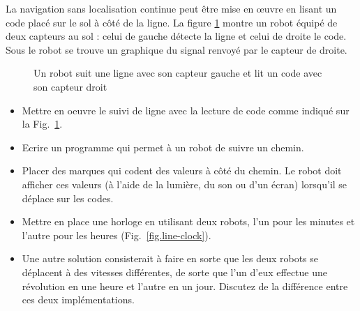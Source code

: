 La navigation sans localisation continue peut être mise en œuvre en lisant un code placé sur le sol à côté de la ligne. La figure \ref{fig.code-line} montre un robot équipé de deux capteurs au sol : celui de gauche détecte la ligne et celui de droite le code. Sous le robot se trouve un graphique du signal renvoyé par le capteur de droite.

\begin{figure}
\begin{center}
\end{center}
\caption{Un robot suit une ligne avec son capteur gauche et lit un code avec son capteur droit}\label{fig.code-line}
\end{figure}

\begin{framed}
\begin{itemize}
\item Mettre en oeuvre le suivi de ligne avec la lecture de code comme indiqué sur la Fig.~\ref{fig.code-line}.
\item Ecrire un programme qui permet à un robot de suivre un chemin.
\item Placer des marques qui codent des valeurs à côté du chemin. Le robot doit afficher ces valeurs (à l'aide de la lumière, du son ou d'un écran) lorsqu'il se déplace sur les codes.
\end{itemize}
\end{framed}

\begin{framed}
\begin{itemize}
\item Mettre en place une horloge en utilisant deux robots, l'un pour les minutes et l'autre pour les heures (Fig.~\ref{fig.line-clock}).
\item Une autre solution consisterait à faire en sorte que les deux robots se déplacent à des vitesses différentes, de sorte que l'un d'eux effectue une révolution en une heure et l'autre en un jour. Discutez de la différence entre ces deux implémentations.
\end{itemize}
\end{framed}

